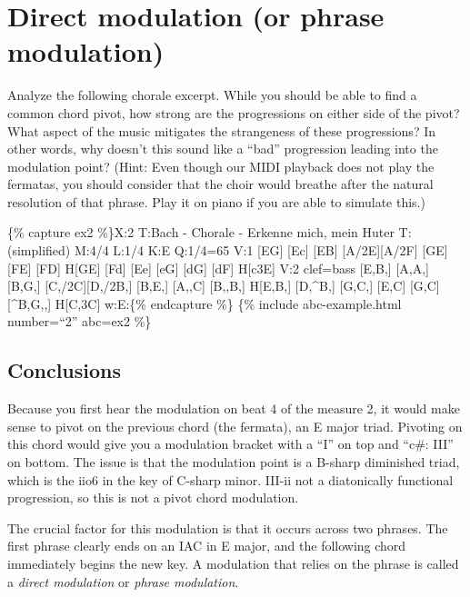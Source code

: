 \documentclass{book}
\begin{document}
\hypertarget{direct-modulation-or-phrase-modulation}{%
\section{Direct modulation (or phrase
modulation)}\label{direct-modulation-or-phrase-modulation}}

Analyze the following chorale excerpt. While you should be able to find a
common chord pivot, how strong are the progressions on either side of the
pivot? What aspect of the music mitigates the strangeness of these
progressions? In other words, why doesn't this sound like a ``bad''
progression leading into the modulation point? (Hint: Even though our MIDI
playback does not play the fermatas, you should consider that the choir would
breathe after the natural resolution of that phrase. Play it on piano if you
are able to simulate this.)

\{\% capture ex2 \%\}X:2 T:Bach - Chorale - Erkenne mich, mein Huter
T:(simplified) M:4/4 L:1/4 K:E Q:1/4=65 V:1 {[}EG{]}\textbar{} {[}Ec{]}
{[}EB{]} {[}A/2E{]}{[}A/2F{]} {[}GE{]}\textbar{} {[}FE{]} {[}FD{]} H{[}GE{]}
{[}Fd{]}\textbar{} {[}Ee{]} {[}eG{]} {[}dG{]} {[}dF{]}\textbar{}
H{[}c3E{]}\textbar{]} V:2 clef=bass {[}E,B,{]}\textbar{} {[}A,A,{]} {[}B,G,{]}
{[}C,/2C{]}{[}D,/2B,{]} {[}B,E,{]}\textbar{} {[}A,,C{]} {[}B,,B,{]}
H{[}E,B,{]} {[}D,\^{}B,{]}\textbar{} {[}G,C,{]} {[}E,C{]} {[}G,C{]}
{[}\^{}B,G,,{]}\textbar{} H{[}C,3C{]}\textbar{]} w:E:\{\% endcapture \%\} \{\%
include abc-example.html number=``2'' abc=ex2 \%\}

\hypertarget{conclusions-56}{%
\subsection{Conclusions}\label{conclusions-56}}

Because you first hear the modulation on beat 4 of the measure 2, it would
make sense to pivot on the previous chord (the fermata), an E major triad.
Pivoting on this chord would give you a modulation bracket with a ``I'' on top
and ``c\#: III'' on bottom. The issue is that the modulation point is a
B-sharp diminished triad, which is the iio6 in the key of C-sharp minor.
III-ii not a diatonically functional progression, so this is not a pivot chord
modulation.

The crucial factor for this modulation is that it occurs across two phrases.
The first phrase clearly ends on an IAC in E major, and the following chord
immediately begins the new key. A modulation that relies on the phrase is
called a \emph{direct modulation} or \emph{phrase modulation}.
\end{document}
